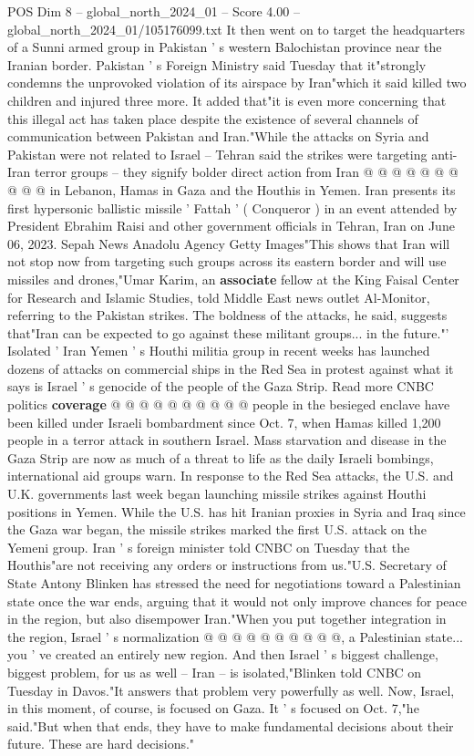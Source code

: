 \begin{textsample}{POS Dim 8 – global\_north\_2024\_01 – Score 4.00 – global\_north\_2024\_01/105176099.txt}
It then went on to target the headquarters of a Sunni armed group in Pakistan ' s western Balochistan province near the Iranian border.
Pakistan ' s Foreign Ministry said Tuesday that it"strongly condemns the unprovoked violation of its airspace by Iran"which it said killed two children and injured three more.
It added that"it is even more concerning that this illegal act has taken place despite the existence of several channels of communication between Pakistan and Iran."While the attacks on Syria and Pakistan were not related to Israel -- Tehran said the strikes were targeting anti-Iran terror groups -- they signify bolder direct action from Iran @ @ @ @ @ @ @ @ @ @ in Lebanon, Hamas in Gaza and the Houthis in Yemen.
Iran presents its first hypersonic ballistic missile ' Fattah ' ( Conqueror ) in an event attended by President Ebrahim Raisi and other government officials in Tehran, Iran on June 06, 2023.
Sepah News Anadolu Agency Getty Images"This shows that Iran will not stop now from targeting such groups across its eastern border and will use missiles and drones,"Umar Karim, an \textbf{associate} fellow at the King Faisal Center for Research and Islamic Studies, told Middle East news outlet Al-Monitor, referring to the Pakistan strikes.
The boldness of the attacks, he said, suggests that"Iran can be expected to go against these militant groups... in the future."' Isolated ' Iran Yemen ' s Houthi militia group in recent weeks has launched dozens of attacks on commercial ships in the Red Sea in protest against what it says is Israel ' s genocide of the people of the Gaza Strip.
Read more CNBC politics \textbf{coverage} @ @ @ @ @ @ @ @ @ @ people in the besieged enclave have been killed under Israeli bombardment since Oct. 7, when Hamas killed 1,200 people in a terror attack in southern Israel.
Mass starvation and disease in the Gaza Strip are now as much of a threat to life as the daily Israeli bombings, international aid groups warn.
In response to the Red Sea attacks, the U.S. and U.K. governments last week began launching missile strikes against Houthi positions in Yemen.
While the U.S. has hit Iranian proxies in Syria and Iraq since the Gaza war began, the missile strikes marked the first U.S. attack on the Yemeni group.
Iran ' s foreign minister told CNBC on Tuesday that the Houthis"are not receiving any orders or instructions from us."U.S.
Secretary of State Antony Blinken has stressed the need for negotiations toward a Palestinian state once the war ends, arguing that it would not only improve chances for peace in the region, but also disempower Iran."When you put together integration in the region, Israel ' s normalization @ @ @ @ @ @ @ @ @ @, a Palestinian state... you ' ve created an entirely new region.
And then Israel ' s biggest challenge, biggest problem, for us as well -- Iran -- is isolated,"Blinken told CNBC on Tuesday in Davos."It answers that problem very powerfully as well.
Now, Israel, in this moment, of course, is focused on Gaza.
It ' s focused on Oct. 7,"he said."But when that ends, they have to make fundamental decisions about their future.
These are hard decisions."

\end{textsample}
